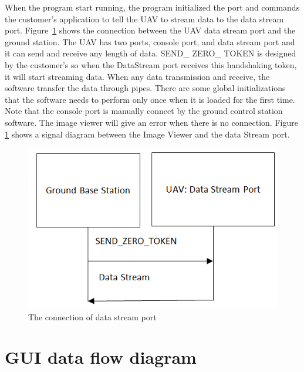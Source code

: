 When the program start running, the program initialized the port and commands the customer’s application to tell the UAV to stream data to the data stream port. Figure~\ref{GCS_connect_command} shows the connection between the UAV data stream port and the ground station. The UAV has two ports, console port, and data stream port and it can send and receive any length of data. SEND\_ ZERO\_ TOKEN is designed by the customer’s so when the DataStream port receives this handshaking token, it will start streaming data. When any data transmission and receive, the software transfer the data through pipes. There are some global initializations that the software needs to perform only once when it is loaded for the first time. Note that the console port is manually connect by the ground control station software. The image viewer will give an error when there is no connection. Figure \ref{GCS_connect_command} shows a signal diagram between the Image Viewer and the data Stream port. 

\begin{figure}[!hbtp]
\begin{center}
\includegraphics[scale=0.5]{figures/connect_command.png} 
\end{center}
\caption{The connection of data stream port\label{GCS_connect_command}}
\end{figure}


\section{GUI data flow diagram}



